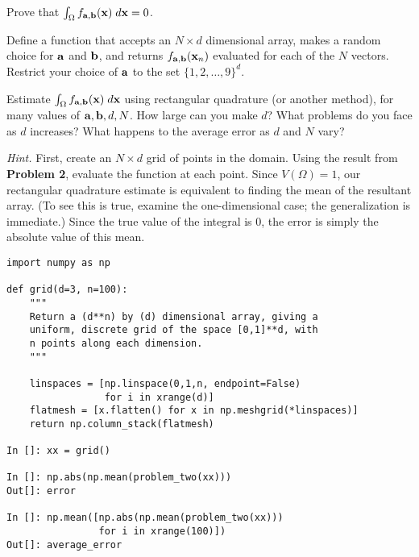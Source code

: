 \begin{problem}
\label{prob:proof}
Prove that $\int_{\Omega} f_{{\bf a},{\bf b}}({\bf x}) \;d{\bf x} = 0$.
\end{problem}

\begin{problem}
\label{prob:fab}
Define a function that accepts an $N \times d$ dimensional array, makes a random
choice for ${\bf a}$ and ${\bf b}$, and returns $f_{{\bf a},{\bf b}}({\bf x}_n)$ evaluated for
each of the $N$ vectors. Restrict your choice of ${\bf a}$ to the set
$\{1,2,\ldots,9\}^d$.
\end{problem}

\begin{problem}
\label{prob:grid}
Estimate $\int_{\Omega} f_{{\bf a},{\bf b}}({\bf x}) \;d{\bf x}$ using rectangular quadrature
(or another method), for many values of ${\bf a}, {\bf b}, d, N$. How large can
you make $d$?  What problems do you face as $d$ increases? What happens to the
average error as $d$ and $N$ vary?

\nopagebreak[2]

\vspace{5mm}
\noindent
{\it Hint.} First, create an $N \times d$ grid of points in the domain. Using
the result from {\bf Problem 2}, evaluate the function at each point. Since
$V(\Omega) = 1$, our rectangular quadrature estimate is equivalent to finding
the mean of the resultant array. (To see this is true, examine the
one-dimensional case; the generalization is immediate.) Since the true value of
the integral is $0$, the error is simply the absolute value of this mean.

\nopagebreak[2]

\begin{verbatim}
import numpy as np

def grid(d=3, n=100):
    """
    Return a (d**n) by (d) dimensional array, giving a 
    uniform, discrete grid of the space [0,1]**d, with 
    n points along each dimension.
    """

    linspaces = [np.linspace(0,1,n, endpoint=False) 
                 for i in xrange(d)]
    flatmesh = [x.flatten() for x in np.meshgrid(*linspaces)]
    return np.column_stack(flatmesh)

In []: xx = grid()

In []: np.abs(np.mean(problem_two(xx)))
Out[]: error

In []: np.mean([np.abs(np.mean(problem_two(xx)))
                for i in xrange(100)])
Out[]: average_error
\end{verbatim}
\end{problem}

